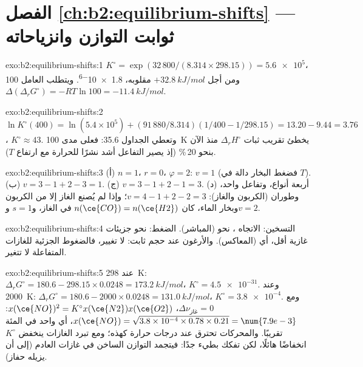 \section*{الفصل \ref{ch:b2:equilibrium-shifts} --- ثوابت التوازن وانزياحاته}

\begin{solution}{exo:b2:equilibrium-shifts:1}
$K^\circ = \exp(32\,800/(8.314 \times 298.15)) = \num{5.6e5}$، ومن أجل
$+\qty{32.8}{kJ/mol}$ مقلوبه، \num{1.8e-6}. ويتطلب العامل 100
$\Delta(\Delta_r G^\circ) = -RT\ln 100 = \qty{-11.4}{kJ/mol}$.
\end{solution}

\begin{solution}{exo:b2:equilibrium-shifts:2}
$\ln K^\circ(400) = \ln(5.4 \times 10^5) + (91\,880/8.314)(1/400 -
1/298.15) = 13.20 - 9.44 = 3.76$، $K^\circ \approx 43$. وتعطي الجداول 35.6:
فعلى مدى \qty{100}{K} يخطئ تقريب ثبات $\Delta_r H^\circ$ منذ الآن
بنحو 20\,\% (إذ يصير التفاعل أشد نشرًا للحرارة مع ارتفاع $T$).
\end{solution}

\begin{solution}{exo:b2:equilibrium-shifts:3}
(أ) $n = 1$، $r = 0$، $\varphi = 2$: $v = 1$ (فضغط البخار دالة
في $T$). (ب) $v = 3 - 1 + 2 - 3 = 1$. (ج) $v = 3 - 1 + 2 - 1 = 3$. (د) أربعة
أنواع، وتفاعل واحد، وطوران (الكربون والغاز): $v = 4 - 1 + 2 - 2 =
3$؛ وإذا لم يُصنع الغاز إلا من الكربون وبخار الماء، كان $n(\ce{CO}) = n(\ce{H2})$
في الغاز، و$s = 1$ و$v = 2$.
\end{solution}

\begin{solution}{exo:b2:equilibrium-shifts:4}
التسخين: الاتجاه ، نحو  (المباشر). الضغط:
نحو جزيئات غازية أقل، أي  (المعاكس). والأرغون عند حجم ثابت:
لا تغيير، فالضغوط الجزئية للغازات المتفاعلة لا تتغير.
\end{solution}

\begin{solution}{exo:b2:equilibrium-shifts:5}
عند \qty{298}{K}: $\Delta_r G^\circ = 180.6 - 298.15 \times 0.0248 =
\qty{173.2}{kJ/mol}$، $K^\circ = \num{4.5e-31}$. وعند \qty{2000}{K}: $\Delta_r
G^\circ = 180.6 - 2000 \times 0.0248 = \qty{131.0}{kJ/mol}$، $K^\circ =
\num{3.8e-4}$. ومع $\Delta\nu_{\text{غاز}} = 0$، $x(\ce{NO})^2 = K^\circ x(\ce{N2})
x(\ce{O2})$: $x(\ce{NO}) = \sqrt{3.8 \times 10^{-4} \times 0.78 \times 0.21} =
\num{7.9e-3}$، أي واحد في المئة تقريبًا. والمحركات تحترق عند درجات حرارة
كهذه؛ ومع تبرد الغازات ينخفض $K^\circ$ انخفاضًا هائلًا، لكن تفكك 
بطيء جدًا: فيتجمد التوازن الساخن في غازات العادم (إلى أن يزيله
حفاز).
\end{solution}

